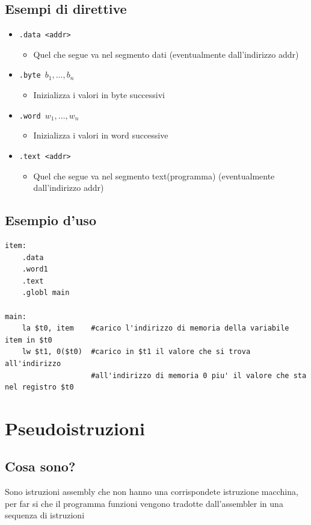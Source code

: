 \subsection{Esempi di direttive}
\begin{itemize}
    \item \texttt{.data <addr>}
    \begin{itemize}
        \item Quel che segue va nel segmento dati (eventualmente dall'indirizzo addr)
    \end{itemize}

    \item \texttt{.byte $b_1,\dots,b_n$}
    \begin{itemize}
        \item Inizializza i valori in byte successivi
    \end{itemize}

    \item \texttt{.word $w_1,\dots,w_n$}
    \begin{itemize}
        \item Inizializza i valori in word successive
    \end{itemize}

    \item \texttt{.text <addr>}
    \begin{itemize}
        \item Quel che segue va nel segmento text(programma) (eventualmente dall'indirizzo addr)
    \end{itemize}
\end{itemize}

\subsection{Esempio d'uso}
\begin{lstlisting}
item:
    .data
    .word1
    .text
    .globl main

main:
    la $t0, item    #carico l'indirizzo di memoria della variabile item in $t0
    lw $t1, 0($t0)  #carico in $t1 il valore che si trova all'indirizzo 
                    #all'indirizzo di memoria 0 piu' il valore che sta nel registro $t0
\end{lstlisting}

\newpage
\section{Pseudoistruzioni}
\subsection{Cosa sono?}
Sono istruzioni assembly che non hanno una corrispondete istruzione macchina, per far si che il programma funzioni vengono tradotte dall'assembler in una sequenza di istruzioni

